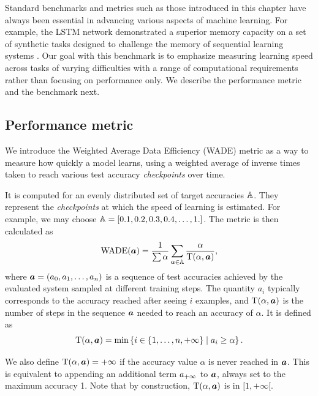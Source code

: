 Standard benchmarks and metrics such as those introduced in this chapter have
always been essential in advancing various aspects of machine learning. For
example, the LSTM network demonstrated a superior memory capacity on a set of
synthetic tasks designed to challenge the memory of sequential learning systems
\parencite{hochreiterLongShortTermMemory1997}. Our goal with this benchmark is
to emphasize measuring learning speed across tasks of varying difficulties with
a range of computational requirements rather than focusing on performance only.
We describe the performance metric and the benchmark next.



\subsection{Performance metric\label{sec:performance-metric}}

We introduce the Weighted Average Data Efficiency (WADE) metric as a way to
measure how quickly a model learns, using a weighted average of inverse times
taken to reach various test accuracy \emph{checkpoints} over time.

It is computed for an evenly distributed set of target accuracies ${\mathbb{A}}$. They
represent the \emph{checkpoints} at which the speed of learning is estimated.
For example, we may choose ${\mathbb{A}} = [0.1, 0.2, 0.3, 0.4, \ldots, 1.]$. The metric is
then calculated as
\begin{equation}
\text{WADE}({\bm{a}}) = \frac{1}{\sum \alpha} \sum_{\alpha \in \mathbb{A}}\frac{\alpha}{\text{T}(\alpha, {\bm{a}})},
\label{eq:wade}
\end{equation}
where ${\bm{a}} = ({a}_{0}, {a}_{1}, \ldots, {a}_{n})$ is a sequence of test accuracies achieved by the evaluated system
sampled at different training steps. The quantity $a_{i}$ typically
corresponds to the accuracy reached after seeing $i$ examples, and
$\text{T}(\alpha, {\bm{a}})$ is the number of steps in the sequence ${\bm{a}}$ needed to reach
an accuracy of $\alpha$. It is defined as
\begin{equation}
  \text{T}(\alpha, {\bm{a}}) = \min\left\{ i \in \{1, \ldots, n, + \infty \}\; |\; a_{i} \geq \alpha \right\}.
\label{eq:tto}
\end{equation}

We also define $\text{T}(\alpha, {\bm{a}}) = +\infty$ if the accuracy value $\alpha$ is never
reached in ${\bm{a}}$. This is equivalent to appending an additional term ${a}_{+\infty}$
to ${\bm{a}}$, always set to the maximum accuracy 1. Note that by construction,
$\text{T}(\alpha, {\bm{a}})$ is in $[1, + \infty [$.

